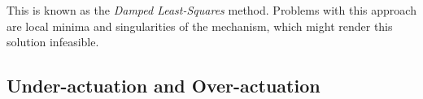 This is known as the \textsl{Damped Least-Squares} method. Problems with this approach are local minima and singularities of the mechanism, which might render this solution infeasible.

\subsection{Under-actuation and Over-actuation}

